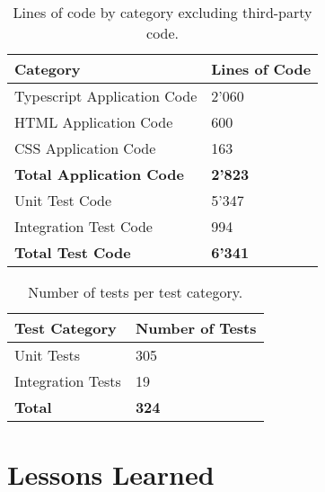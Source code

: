 \begin{table}[H]
    \begin{tabu}{X l}
        \toprule
        \textbf{Category}
        & \textbf{Lines of Code}\\
        \midrule

        Typescript Application Code
        & 2'060 \\

        HTML Application Code
        & 600 \\

        CSS Application Code
        & 163 \\
        \midrule
        \textbf{Total Application Code}
        & \textbf{2'823} \\
        \midrule

        Unit Test Code
        & 5'347 \\

        Integration Test Code
        & 994 \\

        \midrule
        \textbf{Total Test Code}
        & \textbf{6'341} \\
        \midrule

    \end{tabu}
    \caption{Lines of code by category excluding third-party code.}
    \label{tab:lines-of-code}
\end{table}

\begin{table}[H]
    \begin{tabu}{X l}
        \toprule
        Test Category
        & Number of Tests\\
        \midrule

        Unit Tests
        & 305 \\

        Integration Tests
        & 19 \\

        \midrule
        \textbf{Total}
        & \textbf{324} \\

    \end{tabu}
    \caption{Number of tests per test category.}
    \label{tab:lines-of-code}
\end{table}

\section{Lessons Learned}

